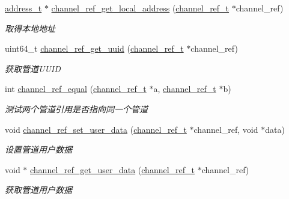 \begin{DoxyCompactItemize}
\hyperlink{a00050_a7a6e75b85c8b441f843bd40004a7d9d5_a7a6e75b85c8b441f843bd40004a7d9d5}{address\+\_\+t} $\ast$ \hyperlink{a00101_ga1dcf6af0c992fa21f9dcd03c8f763ec4_ga1dcf6af0c992fa21f9dcd03c8f763ec4}{channel\+\_\+ref\+\_\+get\+\_\+local\+\_\+address} (\hyperlink{a00050_a151271c9d188ef28d4d24bb81dcc1263_a151271c9d188ef28d4d24bb81dcc1263}{channel\+\_\+ref\+\_\+t} $\ast$channel\+\_\+ref)
\begin{DoxyCompactList}\small\item\em 取得本地地址 \end{DoxyCompactList}\item 
uint64\+\_\+t \hyperlink{a00101_ga3fd39b821fef38abd518db6240e79068_ga3fd39b821fef38abd518db6240e79068}{channel\+\_\+ref\+\_\+get\+\_\+uuid} (\hyperlink{a00050_a151271c9d188ef28d4d24bb81dcc1263_a151271c9d188ef28d4d24bb81dcc1263}{channel\+\_\+ref\+\_\+t} $\ast$channel\+\_\+ref)
\begin{DoxyCompactList}\small\item\em 获取管道\+U\+U\+I\+D \end{DoxyCompactList}\item 
int \hyperlink{a00101_gad44fcb68845cb3ebb582a9de6db9abd0_gad44fcb68845cb3ebb582a9de6db9abd0}{channel\+\_\+ref\+\_\+equal} (\hyperlink{a00050_a151271c9d188ef28d4d24bb81dcc1263_a151271c9d188ef28d4d24bb81dcc1263}{channel\+\_\+ref\+\_\+t} $\ast$a, \hyperlink{a00050_a151271c9d188ef28d4d24bb81dcc1263_a151271c9d188ef28d4d24bb81dcc1263}{channel\+\_\+ref\+\_\+t} $\ast$b)
\begin{DoxyCompactList}\small\item\em 测试两个管道引用是否指向同一个管道 \end{DoxyCompactList}\item 
void \hyperlink{a00101_ga92427ed1f084e9b019acfcdf79bb4b44_ga92427ed1f084e9b019acfcdf79bb4b44}{channel\+\_\+ref\+\_\+set\+\_\+user\+\_\+data} (\hyperlink{a00050_a151271c9d188ef28d4d24bb81dcc1263_a151271c9d188ef28d4d24bb81dcc1263}{channel\+\_\+ref\+\_\+t} $\ast$channel\+\_\+ref, void $\ast$data)
\begin{DoxyCompactList}\small\item\em 设置管道用户数据 \end{DoxyCompactList}\item 
void $\ast$ \hyperlink{a00101_gaf4021842b995f59d23b931dd9ad3ff07_gaf4021842b995f59d23b931dd9ad3ff07}{channel\+\_\+ref\+\_\+get\+\_\+user\+\_\+data} (\hyperlink{a00050_a151271c9d188ef28d4d24bb81dcc1263_a151271c9d188ef28d4d24bb81dcc1263}{channel\+\_\+ref\+\_\+t} $\ast$channel\+\_\+ref)
\begin{DoxyCompactList}\small\item\em 获取管道用户数据 \end{DoxyCompactList}\end{DoxyCompactItemize}



